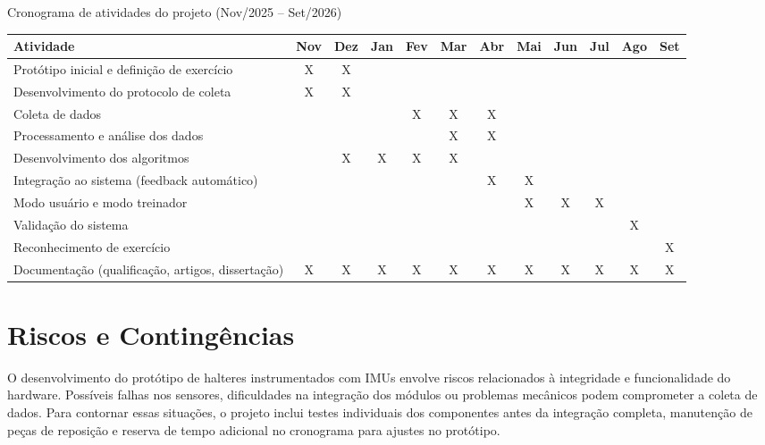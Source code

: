 \begin{quadro}[H]
\centering
\caption{Cronograma de atividades do projeto (Nov/2025 – Set/2026)}
\label{tab:cronograma}
\renewcommand{\arraystretch}{1.3}
\begin{tabular}{|p{4cm}|c|c|c|c|c|c|c|c|c|c|c|}
\hline
\textbf{Atividade} & \textbf{Nov} & \textbf{Dez} & \textbf{Jan} & \textbf{Fev} & \textbf{Mar} & \textbf{Abr} & \textbf{Mai} & \textbf{Jun} & \textbf{Jul} & \textbf{Ago} & \textbf{Set} \\ \hline
Protótipo inicial e definição de exercício & X & X &   &   &   &   &   &   &   &   &   \\ \hline
Desenvolvimento do protocolo de coleta     & X  & X & & &   &   &   &   &   &   &   \\ \hline
Coleta de dados                            &   &   & & X & X & X &   &   &   &   &   \\ \hline
Processamento e análise dos dados          &   &   &   &  & X & X & &   &   &   &   \\ \hline
Desenvolvimento dos algoritmos             &   & X & X & X & X &  &   &  &  &   &   \\ \hline
Integração ao sistema (feedback automático)&   &   &   &   &   & X  & X & & &   &   \\ \hline
Modo usuário e modo treinador              &   &   &   &   &   &   & X  & X & X & &   \\ \hline
Validação do sistema                       &   &   &   &   &   &   &   &   &   & X &   \\ \hline
Reconhecimento de exercício                &   &   &   &   &   &   &   &   &   &   & X \\ \hline
Documentação (qualificação, artigos, dissertação) & X & X  & X  & X  & X  & X  & X  & X  & X  & X & X \\ \hline
\end{tabular}
\end{quadro}


\section{Riscos e Contingências}

O desenvolvimento do protótipo de halteres instrumentados com IMUs envolve riscos relacionados à integridade e funcionalidade do hardware. Possíveis falhas nos sensores, dificuldades na integração dos módulos ou problemas mecânicos podem comprometer a coleta de dados. Para contornar essas situações, o projeto inclui testes individuais dos componentes antes da integração completa, manutenção de peças de reposição e reserva de tempo adicional no cronograma para ajustes no protótipo.


